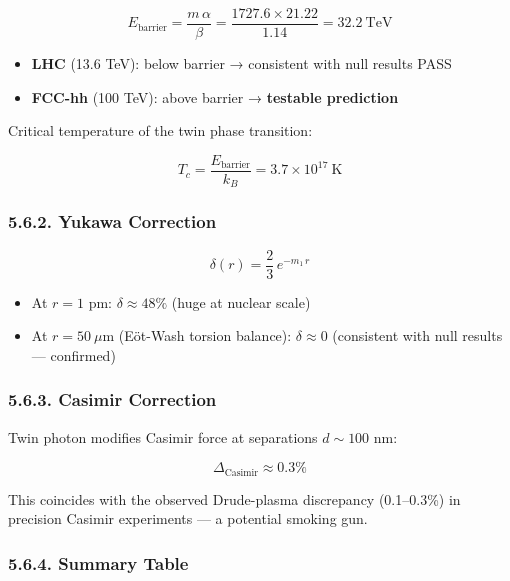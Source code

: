 \documentclass[
  11pt,
]{article}
\providecommand{\tightlist}{%
  \setlength{\itemsep}{0pt}\setlength{\parskip}{0pt}}
\begin{document}
\[E_{\text{barrier}} = \frac{m\,\alpha}{\beta} = \frac{1727.6 \times 21.22}{1.14} = 32.2~\text{TeV} \tag{243}\]

\begin{itemize}
\tightlist
\item
  \textbf{LHC} (13.6 TeV): below barrier → consistent with null results
  PASS
\item
  \textbf{FCC-hh} (100 TeV): above barrier → \textbf{testable
  prediction}
\end{itemize}

Critical temperature of the twin phase transition:

\[T_c = \frac{E_{\text{barrier}}}{k_B} = 3.7 \times 10^{17}~\text{K} \tag{244}\]

\hypertarget{yukawa-correction}{%
\subsubsection{5.6.2. Yukawa Correction}\label{yukawa-correction}}

\[\delta(r) = \frac{2}{3}\,e^{-m_1\,r} \tag{245}\]

\begin{itemize}
\tightlist
\item
  At \(r = 1\) pm: \(\delta \approx 48\%\) (huge at nuclear scale)
\item
  At \(r = 50~\mu\)m (Eöt-Wash torsion balance): \(\delta \approx 0\)
  (consistent with null results --- confirmed)
\end{itemize}

\hypertarget{casimir-correction}{%
\subsubsection{5.6.3. Casimir Correction}\label{casimir-correction}}

Twin photon modifies Casimir force at separations \(d \sim 100\) nm:

\[\Delta_{\text{Casimir}} \approx 0.3\% \tag{246}\]

This coincides with the observed Drude-plasma discrepancy (0.1--0.3\%)
in precision Casimir experiments --- a potential smoking gun.

\hypertarget{summary-table}{%
\subsubsection{5.6.4. Summary Table}\label{summary-table}}
\end{document}
